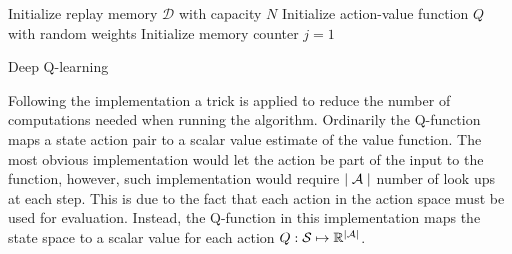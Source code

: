 \begin{algorithm}[H]
\SetAlgoLined
 Initialize replay memory $\mathcal{D}$ with capacity $N$\;
 Initialize action-value function $Q$ with random weights\;
 Initialize memory counter $j=1$\;
\caption{Deep Q-learning}
\label{alg:dqlearning}
\end{algorithm}

Following the implementation \textcite{mnih_playing_2013} a trick is applied to reduce the number of computations needed when running the algorithm. Ordinarily the Q-function maps a state action pair to a scalar value estimate of the value function. The most obvious implementation would let the action be part of the input to the function, however, such implementation would require $\mid \mathcal{A} \mid$ number of look ups at each step. This is due to the fact that each action in the action space must be used for evaluation. Instead, the Q-function in this implementation maps the state space to a scalar value for each action $Q: \mathcal{S} \mapsto \mathbb{R}^{\mid \mathcal{A} \mid}$. 

